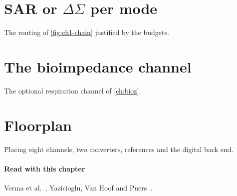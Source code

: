 \section{SAR or \texorpdfstring{$\Delta\Sigma$}{Delta-Sigma} per mode}\label{sec:ch29-4}
The routing of \cref{fig:ch1-chain} justified by the budgets.

\section{The bioimpedance channel}\label{sec:ch29-5}
The optional respiration channel of \cref{ch:bioz}.

\section{Floorplan}\label{sec:ch29-6}
Placing eight channels, two converters, references and the digital back end.

\paragraph{Read with this chapter} Verma et al.~\cite{verma2010}, Yazicioglu, Van Hoof and Puers~\cite{yazicioglubook}.
